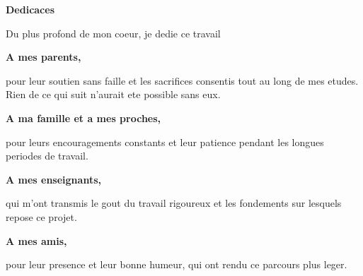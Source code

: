 \sautLiminaire
\thispagestyle{empty}
\vspace*{2.5cm}

\begin{center}
  {\Huge\sffamily\bfseries\color{bleuTitre} Dedicaces\par}
\end{center}

\vspace{2cm}

\begin{center}
\begin{minipage}{0.78\textwidth}
\itshape{}

Du plus profond de mon coeur, je dedie ce travail

\vspace{1cm}
\centering
\textbf{A mes parents,}\\[6pt]
\raggedright
pour leur soutien sans faille et les sacrifices consentis tout au long
de mes etudes. Rien de ce qui suit n'aurait ete possible sans eux.

\vspace{1cm}
\centering
\textbf{A ma famille et a mes proches,}\\[6pt]
\raggedright
pour leurs encouragements constants et leur patience pendant les longues
periodes de travail.

\vspace{1cm}
\centering
\textbf{A mes enseignants,}\\[6pt]
\raggedright
qui m'ont transmis le gout du travail rigoureux et les fondements sur
lesquels repose ce projet.

\vspace{1cm}
\centering
\textbf{A mes amis,}\\[6pt]
\raggedright
pour leur presence et leur bonne humeur, qui ont rendu ce parcours plus
leger.

\end{minipage}
\end{center}

\vfill
\begin{flushright}
  \itshape \etudiantComplet
\end{flushright}
\vspace{1cm}
